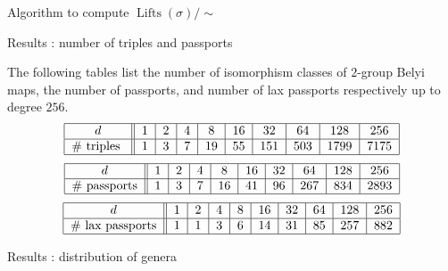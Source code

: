 \documentclass[xcolor=dvipsnames]{beamer}
\theoremstyle{plain}
\DeclareMathOperator{\Lifts}{Lifts}
\begin{document}
{\begin{frame}[fragile]{Algorithm to compute $\Lifts(\sigma)/\!\!\sim$}
\begin{enumerate}
      \end{enumerate}
    \end{frame}
    \begin{frame}{Results : number of triples and passports}
      \begin{theorem}[M.]
        \vspace{1pt}
        The following tables list
        the number of isomorphism classes of
        $2$-group Belyi maps,
        the number of passports, and number of
        lax passports respectively
        up to degree $256$.
        \begin{equation*}
          \begin{tabular}{|c||c|c|c|c|c|c|c|c|c|}
            \hline
            $d$ & $1$ & $2$ & $4$ & $8$ & $16$ & $32$ & $64$ & $128$ & $256$\\
            \hline
            \#\text{ triples } & $1$ & $3$ & $7$ & $19$ & $55$ & $151$ & $503$ & $1799$ & $7175$\\
            \hline
          \end{tabular}
        \end{equation*}
        \begin{equation*}
          \begin{tabular}{|c||c|c|c|c|c|c|c|c|c|}
            \hline
            $d$ & $1$ & $2$ & $4$ & $8$ & $16$ & $32$ & $64$ & $128$ & $256$\\
            \hline
            \# passports & $1$ & $3$ & $7$ & $16$ & $41$ & $96$ & $267$ & $834$ & $2893$\\
            \hline
          \end{tabular}
        \end{equation*}
        \begin{equation*}
          \begin{tabular}{|c||c|c|c|c|c|c|c|c|c|}
            \hline
            $d$ & $1$ & $2$ & $4$ & $8$ & $16$ & $32$ & $64$ & $128$ & $256$\\
            \hline
            \# lax passports & $1$ & $1$ & $3$ & $6$ & $14$ & $31$ & $85$ & $257$ & $882$\\
            \hline
          \end{tabular}
        \end{equation*}
      \end{theorem}
    \end{frame}
    \begin{frame}[fragile]{Results : distribution of genera}
      \begin{figure}[ht]

\end{figure}
\end{frame}}
\end{document}

